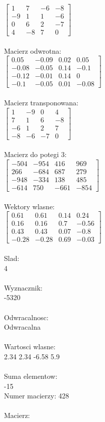 \documentclass[a4paper,12pt]{article}
\begin{document}
$\begin{bmatrix} 1&7&-6&-8\\-9&1&1&-6\\0&6&2&-7\\4&-8&7&0 \end{bmatrix}$
\\
\\
Macierz odwrotna:\\

$\begin{bmatrix} 0.05&-0.09&0.02&0.05\\-0.08&-0.05&0.14&-0.1\\-0.12&-0.01&0.14&0\\-0.1&-0.05&0.01&-0.08 \end{bmatrix}$
\\
\\
Macierz transponowana:\\

$\begin{bmatrix} 1&-9&0&4\\7&1&6&-8\\-6&1&2&7\\-8&-6&-7&0 \end{bmatrix}$
\\
\\
Macierz do potegi 3:\\

$\begin{bmatrix} -504&-954&416&969\\266&-684&687&279\\-948&-334&138&485\\-614&750&-661&-854 \end{bmatrix}$
\\
\\
Wektory wlasne:\\

$\begin{bmatrix} 0.61&0.61&0.14&0.24\\0.16&0.16&0.7&-0.56\\0.43&0.43&0.07&-0.8\\-0.28&-0.28&0.69&-0.03 \end{bmatrix}$
\\
\\
Slad:\\
4
\\
\\
Wyznacznik:\\
-5320
\\
\\
Odwracalnosc:\\
Odwracalna
\\
\\
Wartosci wlasne:\\
2.34 2.34 -6.58 5.9
\\
\\
Suma elementow:\\
-15
\\
\newpage
Numer macierzy:
428
\\
\\
Macierz:\\
\end{document}
